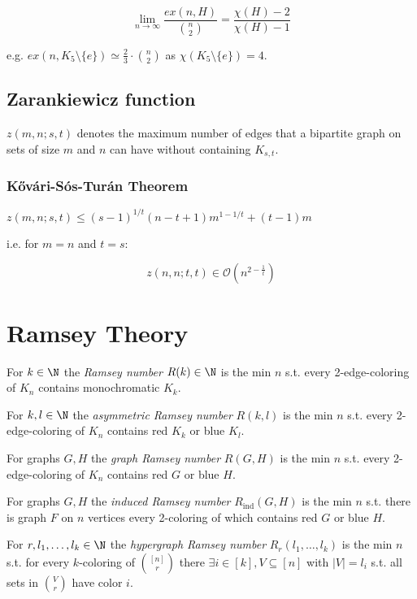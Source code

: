 \[ \lim_{n \to \infty} \frac{ex(n,H)}{{n \choose 2}} = \frac{\chi(H)-2}{\chi(H)-1} \]

e.g. $ex(n,K_5 \setminus \{e\}) \simeq \frac{2}{3} \cdot {n \choose 2}$ as $\chi(K_5 \setminus \{e\}) = 4$.

\subsection*{Zarankiewicz function}

$z(m,n;s,t)$ denotes the maximum number of edges that a bipartite graph on sets of size $m$ and $n$ can have without containing $K_{s,t}$.

\subsubsection*{K\H{o}v\'{a}ri-S\'{o}s-Tur\'{a}n Theorem}

$z(m,n;s,t) \leq (s-1)^{1/t}(n-t+1)m^{1-1/t}+(t-1)m$

i.e. for $m=n$ and $t=s$:

\vspace*{-2mm}
\[ z(n,n;t,t) \in \mathcal{O}(n^{2-\frac{1}{t}}) \]

\section*{Ramsey Theory}

For $k \in \N$ the \emph{Ramsey number} $R(k) \in \N$ is the min $n$ s.t. every 2-edge-coloring of $K_n$ contains monochromatic $K_k$.

\spacing

For $k, l \in \N$ the \emph{asymmetric Ramsey number} $R(k,l)$ is the min $n$ s.t. every 2-edge-coloring of $K_n$ contains red $K_k$ or blue $K_l$.

\spacing

For graphs $G, H$ the \emph{graph Ramsey number} $R(G,H)$ is the min $n$ s.t. every 2-edge-coloring of $K_n$ contains red $G$ or blue $H$.

\spacing

For graphs $G, H$ the \emph{induced Ramsey number} $R_\text{ind}(G,H)$ is the min $n$ s.t. there is graph $F$ on $n$ vertices every 2-coloring of which contains red $G$ or blue $H$.

\spacing

For $r, l_1, \dots, l_k \in \N$ the \emph{hypergraph Ramsey number} $R_r(l_1,\dots,l_k)$ is the min $n$ s.t. for every $k$-coloring of ${[n] \choose r}$ there $\exists i \in [k], V \subseteq [n]$ with $|V|=l_i$ s.t. all sets in $V \choose r$ have color $i$.

